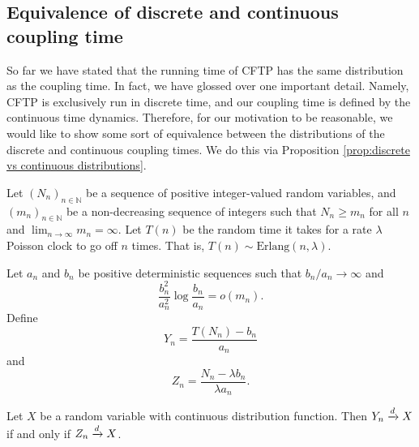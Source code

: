 	\subsection{Equivalence of discrete and continuous coupling time}
	So far we have stated that the running time of CFTP has the same distribution as the coupling time. In fact, we have glossed over one important detail. Namely, CFTP is exclusively run in discrete time, and our coupling time is defined by the continuous time dynamics. Therefore, for our motivation to be reasonable, we would like to show some sort of equivalence between the distributions of the discrete and continuous coupling times. We do this via Proposition \ref{prop:discrete vs continuous distributions}. 

	\begin{proposition}
	\label{prop:discrete vs continuous distributions}
		Let $(N_n)_{n \in \mathbb{N}}$ be a sequence of positive integer-valued random variables, and $(m_n)_{n \in \mathbb{N}}$ be a non-decreasing sequence of integers such that $N_n \geq m_n$ for all $n$ and $\lim_{n \rightarrow \infty} m_n = \infty$. Let $T(n)$ be the random time it takes for a rate $\lambda$ Poisson clock to go off $n$ times. That is, $T(n) \sim \mathrm{Erlang}(n, \lambda)$.

		Let $a_n$ and $b_n$ be positive deterministic sequences such that $b_n / a_n \rightarrow \infty$ and
		\begin{equation}
			\frac{b_n^2}{a_n^2}\log\frac{b_n}{a_n} = o(m_n).
			\label{eq:m_n a_n b_n constraint}
		\end{equation}
		Define
		\begin{equation}
			Y_n = \frac{T(N_n) - b_n}{a_n}
		\end{equation}
		and 
		\begin{equation}
			Z_n = \frac{N_n - \lambda b_n}{\lambda a_n}.
		\end{equation}

		Let $X$ be a random variable with continuous distribution function. Then $Y_n \xrightarrow{d} X$ if and only if $Z_n \xrightarrow{d} X$.


	\end{proposition}

